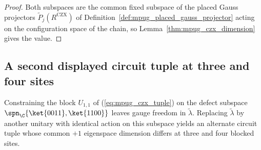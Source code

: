 \begin{proof}\leanok
    Both subspaces are the common fixed subspace of the placed Gauss
    projectors $\widetilde P_j(R^{\mathrm{CZX}})$ of
    Definition~\ref{def:mpug_placed_gauss_projector} acting on the
    configuration space of the chain, so
    Lemma~\ref{thm:mpug_czx_dimension} gives the value.
\end{proof}

\subsection{A second displayed circuit tuple at three and four sites}

Constraining the block $U_{1,1}$ of (\ref{eq:mpug_czx_tuple}) on the defect
subspace $\spn_{\C}\{\ket{0011},\ket{1100}\}$ leaves gauge freedom in
$\tilde\lambda$. Replacing $\tilde\lambda$ by another unitary with identical
action on this subspace yields an alternate circuit tuple whose common $+1$
eigenspace dimension differs at three and four blocked sites.

